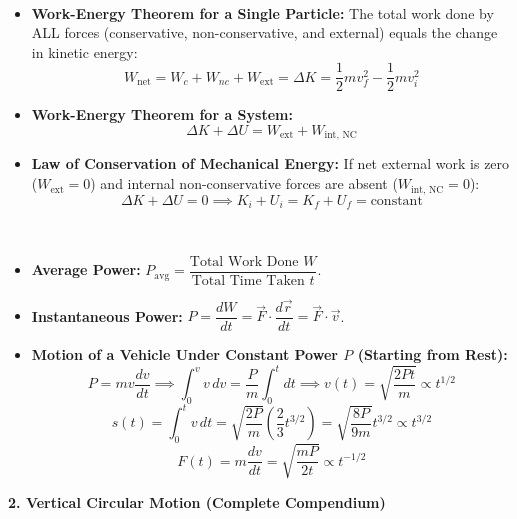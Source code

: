 \documentclass[11pt,a4paper]{article}
\begin{document}
\vspace{5pt}
\noindent{\large\textbf{\textsf{\textcolor{primaryDark}{1.7 Work-Energy Theorem \& Mechanical Energy Conservation}}}}\\[3pt]
\begin{itemize}[leftmargin=14pt,itemsep=2pt]
  \item \textbf{Work-Energy Theorem for a Single Particle:} The total work done by ALL forces (conservative, non-conservative, and external) equals the change in kinetic energy:
  \[
    W_{\text{net}} = W_c + W_{nc} + W_{\text{ext}} = \Delta K = \frac{1}{2}mv_f^2 - \frac{1}{2}mv_i^2
  \]
  \item \textbf{Work-Energy Theorem for a System:}
  \[
    \Delta K + \Delta U = W_{\text{ext}} + W_{\text{int, NC}}
  \]
  \item \textbf{Law of Conservation of Mechanical Energy:} If net external work is zero ($W_{\text{ext}} = 0$) and internal non-conservative forces are absent ($W_{\text{int, NC}} = 0$):
  \[
    \Delta K + \Delta U = 0 \implies K_i + U_i = K_f + U_f = \text{constant}
  \]
\end{itemize}

\vspace{5pt}
\noindent{\large\textbf{\textsf{\textcolor{primaryDark}{1.8 Power Definitions \& Constant Power Dynamics}}}}\\[3pt]
\begin{itemize}[leftmargin=14pt,itemsep=1.5pt]
  \item \textbf{Average Power:} $P_{\text{avg}} = \dfrac{\text{Total Work Done } W}{\text{Total Time Taken } t}$.
  \item \textbf{Instantaneous Power:} $P = \dfrac{dW}{dt} = \vec{F} \cdot \dfrac{d\vec{r}}{dt} = \vec{F} \cdot \vec{v}$.
  \item \textbf{Motion of a Vehicle Under Constant Power $P$ (Starting from Rest):}
  \[
    P = m v \frac{dv}{dt} \implies \int_0^v v\,dv = \frac{P}{m}\int_0^t dt \implies v(t) = \sqrt{\frac{2Pt}{m}} \propto t^{1/2}
  \]
  \[
    s(t) = \int_0^t v\,dt = \sqrt{\frac{2P}{m}} \left(\frac{2}{3}t^{3/2}\right) = \sqrt{\frac{8P}{9m}} t^{3/2} \propto t^{3/2}
  \]
  \[
    F(t) = m\frac{dv}{dt} = \sqrt{\frac{mP}{2t}} \propto t^{-1/2}
  \]
\end{itemize}

\vspace{10pt}

\begin{tcolorbox}[chapterbanner]
  {\Large \textbf{\textsf{2. Vertical Circular Motion (Complete Compendium)}}}
\end{tcolorbox}
\vspace{4pt}
\end{document}
